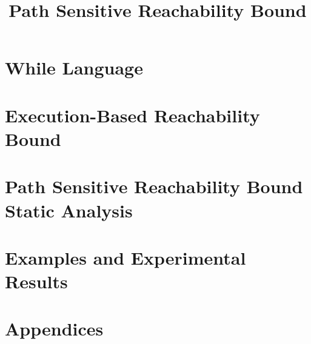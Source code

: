 \documentclass[a4paper,11pt]{article}
\newcommand{\highlight}[1]{\textcolor[rgb]{.0,0.0,1.0}{ #1}}
\begin{document}
\title{Path Sensitive Reachability Bound}

\author{}

\date{}

\maketitle
%
\tableofcontents

% 
\section{{While Language}}
\label{sec:language}

\clearpage
% 
% 
\section{\highlight{Execution-Based Reachability Bound}}
\label{sec:execution_rb}

\clearpage
\section{Path Sensitive Reachability Bound Static Analysis }
\label{sec:static_pathsensitiverb}



\clearpage
%
\section{Examples and Experimental Results}

%
\clearpage
\appendix
{}
\section*{Appendices}

\end{document}
